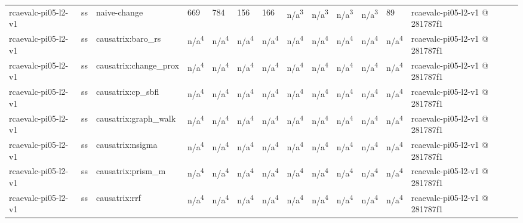 \begin{table}[t]
\begin{tabular}{lllllllllllll}
rcaevalc-pi05-l2-v1 & ss & naive-change & 669 & 784 & 156 & 166 & n/a\textsuperscript{3} & n/a\textsuperscript{3} & n/a\textsuperscript{3} & n/a\textsuperscript{3} & 89 & rcaevalc-pi05-l2-v1 @ 281787f1 \\
rcaevalc-pi05-l2-v1 & ss & causatrix:baro\_rs & n/a\textsuperscript{4} & n/a\textsuperscript{4} & n/a\textsuperscript{4} & n/a\textsuperscript{4} & n/a\textsuperscript{4} & n/a\textsuperscript{4} & n/a\textsuperscript{4} & n/a\textsuperscript{4} & n/a\textsuperscript{4} & rcaevalc-pi05-l2-v1 @ 281787f1 \\
rcaevalc-pi05-l2-v1 & ss & causatrix:change\_prox & n/a\textsuperscript{4} & n/a\textsuperscript{4} & n/a\textsuperscript{4} & n/a\textsuperscript{4} & n/a\textsuperscript{4} & n/a\textsuperscript{4} & n/a\textsuperscript{4} & n/a\textsuperscript{4} & n/a\textsuperscript{4} & rcaevalc-pi05-l2-v1 @ 281787f1 \\
rcaevalc-pi05-l2-v1 & ss & causatrix:cp\_sbfl & n/a\textsuperscript{4} & n/a\textsuperscript{4} & n/a\textsuperscript{4} & n/a\textsuperscript{4} & n/a\textsuperscript{4} & n/a\textsuperscript{4} & n/a\textsuperscript{4} & n/a\textsuperscript{4} & n/a\textsuperscript{4} & rcaevalc-pi05-l2-v1 @ 281787f1 \\
rcaevalc-pi05-l2-v1 & ss & causatrix:graph\_walk & n/a\textsuperscript{4} & n/a\textsuperscript{4} & n/a\textsuperscript{4} & n/a\textsuperscript{4} & n/a\textsuperscript{4} & n/a\textsuperscript{4} & n/a\textsuperscript{4} & n/a\textsuperscript{4} & n/a\textsuperscript{4} & rcaevalc-pi05-l2-v1 @ 281787f1 \\
rcaevalc-pi05-l2-v1 & ss & causatrix:nsigma & n/a\textsuperscript{4} & n/a\textsuperscript{4} & n/a\textsuperscript{4} & n/a\textsuperscript{4} & n/a\textsuperscript{4} & n/a\textsuperscript{4} & n/a\textsuperscript{4} & n/a\textsuperscript{4} & n/a\textsuperscript{4} & rcaevalc-pi05-l2-v1 @ 281787f1 \\
rcaevalc-pi05-l2-v1 & ss & causatrix:prism\_m & n/a\textsuperscript{4} & n/a\textsuperscript{4} & n/a\textsuperscript{4} & n/a\textsuperscript{4} & n/a\textsuperscript{4} & n/a\textsuperscript{4} & n/a\textsuperscript{4} & n/a\textsuperscript{4} & n/a\textsuperscript{4} & rcaevalc-pi05-l2-v1 @ 281787f1 \\
rcaevalc-pi05-l2-v1 & ss & causatrix:rrf & n/a\textsuperscript{4} & n/a\textsuperscript{4} & n/a\textsuperscript{4} & n/a\textsuperscript{4} & n/a\textsuperscript{4} & n/a\textsuperscript{4} & n/a\textsuperscript{4} & n/a\textsuperscript{4} & n/a\textsuperscript{4} & rcaevalc-pi05-l2-v1 @ 281787f1 \\

\end{tabular}
\end{table}
